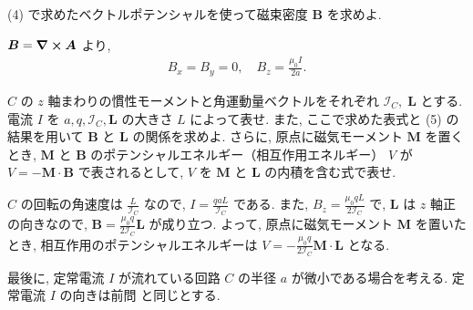 \documentclass[../../ou-physics-exam.tex]{subfiles}
\begin{document}
(4) で求めたベクトルポテンシャルを使って磁束密度 $ \bm{B} $ を求めよ.
\begin{answer}
    $ \bm{B} = \curl \bm{A} $ より,
    \begin{align*}
        B_x = B_y = 0, \quad B_z = \frac{\mu_0 I}{2a}.
    \end{align*}
\end{answer}

$ C $ の $ z $ 軸まわりの慣性モーメントと角運動量ベクトルをそれぞれ $ \mathcal{I}_C , \; \bm{L} $ とする. 
電流 $ I $ を $ a, q, \mathcal{I}_C, \bm{L} $ の大きさ $ L $ によって表せ. 
また, ここで求めた表式と (5) の結果を用いて $ \bm{B} $ と $ \bm{L} $ の関係を求めよ. 
さらに, 原点に磁気モーメント $ \bm{M} $ を置くとき, $ \bm{M} $ と $ \bm{B} $ のポテンシャルエネルギー（相互作用エネルギー） $ V $ が $ V = - \bm{M} \cdot \bm{B} $ で表されるとして, $ V $ を $ \bm{M} $ と $ \bm{L} $ の内積を含む式で表せ.
\begin{answer}
    $ C $ の回転の角速度は $ \displaystyle \frac{L}{\mathcal{I}_C } $ なので, $ \displaystyle I = \frac{qaL}{\mathcal{I}_C } $ である. 
    また, $ \displaystyle B_z = \frac{\mu_0 qL}{2 \mathcal{I}_C} $ で, $ \bm{L} $ は $ z $ 軸正の向きなので, $ \displaystyle \bm{B} = \frac{\mu_0 q}{2 \mathcal{I}_C} \bm{L} $ が成り立つ. 
    よって, 原点に磁気モーメント $ \bm{M} $ を置いたとき, 相互作用のポテンシャルエネルギーは $ \displaystyle V = - \frac{\mu_0 q}{2 \mathcal{I}_C} \bm{M} \cdot \bm{L} $ となる.
\end{answer}

最後に, 定常電流 $ I $ が流れている回路 $ C $ の半径 $ a $ が微小である場合を考える. 
定常電流 $ I $ の向きは前問 \setcounter{prob}{2}  と同じとする.
\end{document}
